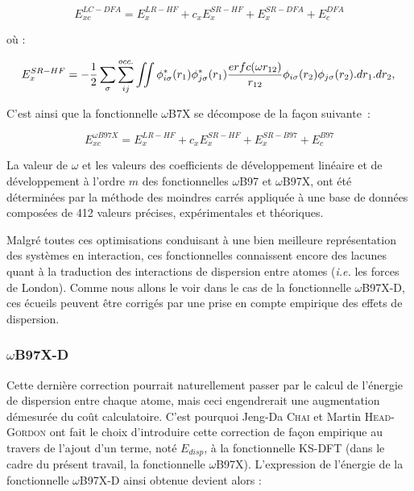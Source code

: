 \documentclass[12pt,a4paper]{book}
\begin{document}
	\begin{equation}
	E_{xc}^{LC-DFA} = E_{x}^{LR-HF} + c_{x}E_{x}^{SR-HF} + E_{x}^{SR-DFA} + E_{c}^{DFA}
	\end{equation}
	
	\noindent où :
	
	\begin{equation}
	E_{x}^{SR-HF} = -\frac{1}{2} \sum_{\sigma} \sum_{ij}^{occ.} \iint \phi_{i \sigma}^{*}(r_{1}) \phi_{j \sigma}^{*}(r_{1}) \frac{erfc(\omega r_{12})}{r_{12}} \phi_{i \sigma}(r_{2}) \phi_{j \sigma}(r_{2}).dr_{1}.dr_{2}, \\
	\end{equation}
	
	C'est ainsi que la fonctionnelle $\omega$B7X\cite{chai2008long} se décompose de la façon suivante~:
	
	\begin{equation}
	E_{xc}^{\omega B97X} = E_{x}^{LR-HF} + c_{x}E_{x}^{SR-HF} + E_{x}^{SR-B97} + E_{c}^{B97}
	\end{equation}
	
	La valeur de $\omega$ et les valeurs des coefficients de développement linéaire et de développement à l'ordre $m$ des fonctionnelles $\omega$B97 et $\omega$B97X, ont été déterminées par la méthode des moindres carrés appliquée à une base de données composées de 412 valeurs précises, expérimentales et théoriques.
	
	Malgré toutes ces optimisations conduisant à une bien meilleure représentation des systèmes en interaction, ces fonctionnelles connaissent encore des lacunes quant à la traduction des interactions de dispersion entre atomes (\textit{i.e.} les forces de London). Comme nous allons le voir dans le cas de la fonctionnelle $\omega$B97X-D, ces écueils peuvent être corrigés par une prise en compte empirique des effets de dispersion.
	
	\subsubsection{$\omega$B97X-D}
	
	Cette dernière correction pourrait naturellement passer par le calcul de l'énergie de dispersion entre chaque atome, mais ceci engendrerait une augmentation démesurée du coût calculatoire. C'est pourquoi Jeng-Da \textsc{Chai} et Martin \textsc{Head-Gordon} ont fait le choix d'introduire cette correction de façon empirique au travers de l'ajout d'un terme, noté $E_{disp}$, à la fonctionnelle KS-DFT (dans le cadre du présent travail, la fonctionnelle $\omega$B97X). L'expression de l'énergie de la fonctionnelle $\omega$B97X-D \cite{chai2008long} ainsi obtenue devient alors :
	
\end{document}
